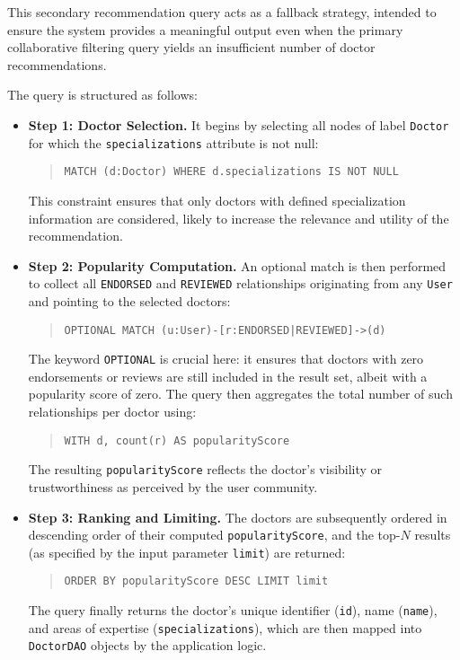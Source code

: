 This secondary recommendation query acts as a fallback strategy, intended to ensure the system provides a meaningful output even when the primary collaborative filtering query yields an insufficient number of doctor recommendations.

The query is structured as follows:
\begin{itemize}
	\item \textbf{Step 1: Doctor Selection.} It begins by selecting all nodes of label \texttt{Doctor} for which the \texttt{specializations} attribute is not null:
	\begin{quote}
		\texttt{MATCH (d:Doctor) WHERE d.specializations IS NOT NULL}
	\end{quote}
	This constraint ensures that only doctors with defined specialization information are considered, likely to increase the relevance and utility of the recommendation.
	
	\item \textbf{Step 2: Popularity Computation.} An optional match is then performed to collect all \texttt{ENDORSED} and \texttt{REVIEWED} relationships originating from any \texttt{User} and pointing to the selected doctors:
	\begin{quote}
		\texttt{OPTIONAL MATCH (u:User)-[r:ENDORSED|REVIEWED]->(d)}
	\end{quote}
	The keyword \texttt{OPTIONAL} is crucial here: it ensures that doctors with zero endorsements or reviews are still included in the result set, albeit with a popularity score of zero. The query then aggregates the total number of such relationships per doctor using:
	\begin{quote}
		\texttt{WITH d, count(r) AS popularityScore}
	\end{quote}
	The resulting \texttt{popularityScore} reflects the doctor's visibility or trustworthiness as perceived by the user community.
	
	\item \textbf{Step 3: Ranking and Limiting.} The doctors are subsequently ordered in descending order of their computed \texttt{popularityScore}, and the top-$N$ results (as specified by the input parameter \texttt{limit}) are returned:
	\begin{quote}
		\texttt{ORDER BY popularityScore DESC LIMIT limit}
	\end{quote}
	The query finally returns the doctor's unique identifier (\texttt{id}), name (\texttt{name}), and areas of expertise (\texttt{specializations}), which are then mapped into \texttt{DoctorDAO} objects by the application logic.
\end{itemize}

